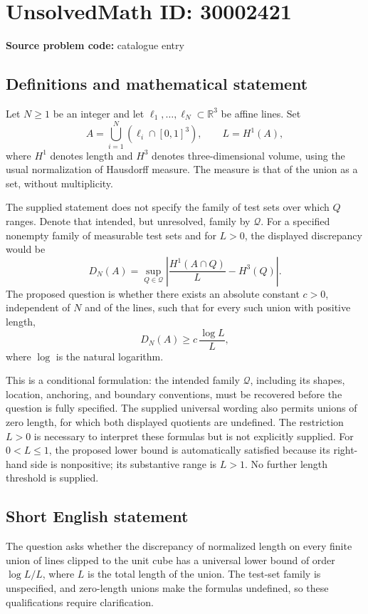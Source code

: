 \documentclass[11pt]{article}
\newcommand{\R}{\mathbb{R}}
\begin{document}
\section*{UnsolvedMath ID: 30002421}
\textbf{Source problem code:} catalogue entry
\subsection{Definitions and mathematical statement}
Let \(N\geq 1\) be an integer and let \(\ell_1,\ldots,\ell_N\subset\R^3\) be affine lines. Set
\[
A=\bigcup_{i=1}^{N}(\ell_i\cap[0,1]^3),\qquad L=H^1(A),
\]
where \(H^1\) denotes length and \(H^3\) denotes three-dimensional volume, using the usual normalization of Hausdorff measure. The measure is that of the union as a set, without multiplicity.

The supplied statement does not specify the family of test sets over which \(Q\) ranges. Denote that intended, but unresolved, family by \(\mathcal Q\). For a specified nonempty family of measurable test sets and for \(L>0\), the displayed discrepancy would be
\[
D_N(A)=\sup_{Q\in\mathcal Q}\left|\frac{H^1(A\cap Q)}{L}-H^3(Q)\right|.
\]
The proposed question is whether there exists an absolute constant \(c>0\), independent of \(N\) and of the lines, such that for every such union with positive length,
\[
D_N(A)\geq c\,\frac{\log L}{L},
\]
where \(\log\) is the natural logarithm.

This is a conditional formulation: the intended family \(\mathcal Q\), including its shapes, location, anchoring, and boundary conventions, must be recovered before the question is fully specified. The supplied universal wording also permits unions of zero length, for which both displayed quotients are undefined. The restriction \(L>0\) is necessary to interpret these formulas but is not explicitly supplied. For \(0<L\leq 1\), the proposed lower bound is automatically satisfied because its right-hand side is nonpositive; its substantive range is \(L>1\). No further length threshold is supplied.
\subsection{Short English statement}
The question asks whether the discrepancy of normalized length on every finite union of lines clipped to the unit cube has a universal lower bound of order \(\log L/L\), where \(L\) is the total length of the union. The test-set family is unspecified, and zero-length unions make the formulas undefined, so these qualifications require clarification.
\end{document}
